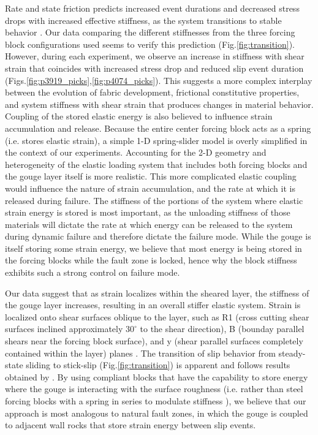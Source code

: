 Rate and state friction predicts increased event durations and decreased stress
drops with increased effective stiffness, as the system transitions to stable
behavior \cite{Baumberger_1999}. Our data comparing the different stiffnesses
from the three forcing block configurations used seems to verify this prediction
(Fig.\ref{fig:transition}).  However, during each experiment, we observe an
increase in stiffness with shear strain that coincides with increased stress
drop and reduced slip event duration
(Figs.\ref{fig:p3919_picks},\ref{fig:p4074_picks}).  This suggests a more
complex interplay between the evolution of fabric development, frictional
constitutive properties, and system stiffness with shear strain that produces
changes in material behavior.  Coupling of the stored elastic energy is also
believed to influence strain accumulation and release.  Because the entire
center forcing block acts as a spring (i.e. stores elastic strain), a simple 1-D
spring-slider model is overly simplified in the context of our experiments.
Accounting for the 2-D geometry and heterogeneity of the elastic loading system
that includes both forcing blocks and the gouge layer itself is more realistic.
This more complicated elastic coupling would influence the nature of strain
accumulation, and the rate at which it is released during failure. The stiffness
of the portions of the system where elastic strain energy is stored is most
important, as the unloading stiffness of those materials will dictate the rate
at which energy can be released to the system during dynamic failure and
therefore dictate the failure mode. While the gouge is itself storing some
strain energy, we believe that most energy is being stored in the forcing blocks
while the fault zone is locked, hence why the block stiffness exhibits such a strong
control on failure mode.

Our data suggest that as strain localizes within the sheared layer, the
stiffness of the gouge layer increases, resulting in an overall stiffer elastic
system. Strain is localized onto shear surfaces oblique to the layer, such as R1
(cross cutting shear surfaces inclined approximately $30^\circ$ to the shear
direction), B (bounday parallel shears near the forcing block surface), and y
(shear parallel surfaces completely contained within the layer) planes
\cite{loganl1992fabrics,Marone_1998}.  The transition of slip behavior from
steady-state sliding to stick-slip (Fig.\ref{fig:transition}) is apparent and
follows results obtained by \cite{Baumberger_1999}. By using compliant blocks
that have the capability to store energy where the gouge is interacting with the
surface roughness (i.e. rather than steel forcing blocks with a spring in series
to modulate stiffness \cite{Kaproth:2013jz}), we believe that our approach is
most analogous to natural fault zones, in which the gouge is coupled to adjacent
wall rocks that store strain energy between slip events.

